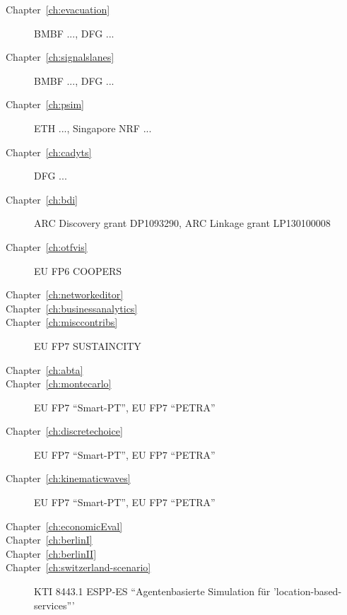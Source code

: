 \begin{description}
\item[Chapter~\ref{ch:evacuation}]  BMBF ..., DFG ... 

\item[Chapter~\ref{ch:signalslanes}]  BMBF ..., DFG ...

\item[Chapter~\ref{ch:psim}]  ETH ..., Singapore NRF ...

\item[Chapter~\ref{ch:cadyts}]  DFG ... 

\item[Chapter~\ref{ch:bdi}]  ARC Discovery grant DP1093290, ARC Linkage grant LP130100008 
%
%
%
\item[Chapter~\ref{ch:otfvis}]  EU FP6 COOPERS 

\item[Chapter~\ref{ch:networkeditor}]  

\item[Chapter~\ref{ch:businessanalytics}]  

\item[Chapter~\ref{ch:misccontribs}]  EU FP7 SUSTAINCITY 
%
%
%
%
%
\item[Chapter~\ref{ch:abta}]  

\item[Chapter~\ref{ch:montecarlo}]  EU FP7 ``Smart-PT'', EU FP7 ``PETRA'' 

\item[Chapter~\ref{ch:discretechoice}]  EU FP7 ``Smart-PT'', EU FP7 ``PETRA'' 

\item[Chapter~\ref{ch:kinematicwaves}]  EU FP7 ``Smart-PT'', EU FP7 ``PETRA''  

\item[Chapter~\ref{ch:economicEval}]  

\item[Chapter~\ref{ch:berlinI}]  

\item[Chapter~\ref{ch:berlinII}]  

\item[Chapter~\ref{ch:switzerland-scenario}]  KTI 8443.1 ESPP-ES ``Agentenbasierte Simulation für 'location-based-services'''


\end{description}
